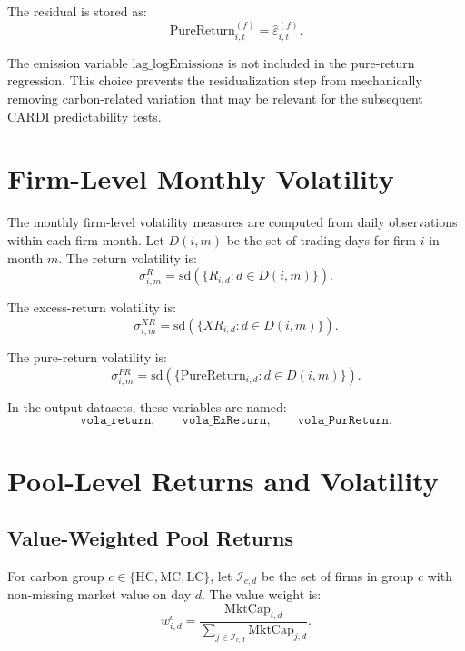\documentclass[11pt]{article}
\begin{document}
The residual is stored as:
\begin{equation}
\mathrm{PureReturn}_{i,t}^{(f)}
=
\widehat{\varepsilon}_{i,t}^{(f)}.
\end{equation}

The emission variable \(\mathrm{lag\_logEmissions}\) is not included in the
pure-return regression. This choice prevents the residualization step from
mechanically removing carbon-related variation that may be relevant for the
subsequent CARDI predictability tests.

\section{Firm-Level Monthly Volatility}

The monthly firm-level volatility measures are computed from daily observations
within each firm-month. Let \(D(i,m)\) be the set of trading days for firm \(i\)
in month \(m\). The return volatility is:
\begin{equation}
\sigma^{R}_{i,m}
=
\mathrm{sd}\left(\{R_{i,d}: d \in D(i,m)\}\right).
\end{equation}

The excess-return volatility is:
\begin{equation}
\sigma^{XR}_{i,m}
=
\mathrm{sd}\left(\{XR_{i,d}: d \in D(i,m)\}\right).
\end{equation}

The pure-return volatility is:
\begin{equation}
\sigma^{PR}_{i,m}
=
\mathrm{sd}\left(\{\mathrm{PureReturn}_{i,d}: d \in D(i,m)\}\right).
\end{equation}

In the output datasets, these variables are named:
\[
\texttt{vola\_return},\qquad
\texttt{vola\_ExReturn},\qquad
\texttt{vola\_PurReturn}.
\]

\section{Pool-Level Returns and Volatility}

\subsection{Value-Weighted Pool Returns}

For carbon group \(c \in \{\mathrm{HC},\mathrm{MC},\mathrm{LC}\}\), let
\(\mathcal{I}_{c,d}\) be the set of firms in group \(c\) with non-missing
market value on day \(d\). The value weight is:
\begin{equation}
w_{i,d}^{c}
=
\frac{\mathrm{MktCap}_{i,d}}
{\sum_{j \in \mathcal{I}_{c,d}}\mathrm{MktCap}_{j,d}}.
\end{equation}
\end{document}
